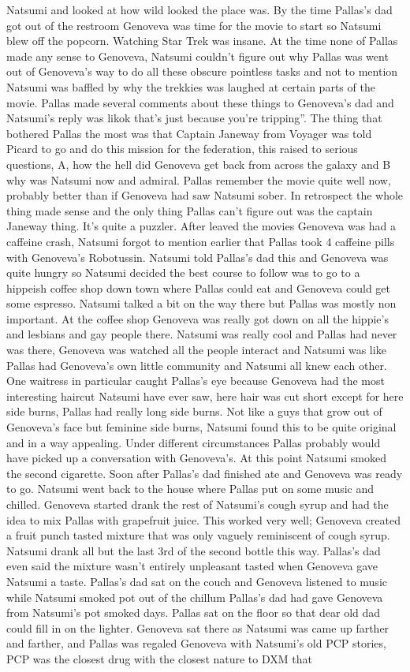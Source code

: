\documentclass[12pt]{book}
\begin{document}
Natsumi and looked at how wild looked the place was. By the time Pallas's dad got out of the restroom Genoveva was time for the movie to start so Natsumi blew off the popcorn. Watching Star Trek was insane. At the time none of Pallas made any sense to Genoveva, Natsumi couldn't figure out why Pallas was went out of Genoveva's way to do all these obscure pointless tasks and not to mention Natsumi was baffled by why the trekkies was laughed at certain parts of the movie. Pallas made several comments about these things to Genoveva's dad and Natsumi's reply was likok that's just because you're tripping''. The thing that bothered Pallas the most was that Captain Janeway from Voyager was told Picard to go and do this mission for the federation, this raised to serious questions, A, how the hell did Genoveva get back from across the galaxy and B why was Natsumi now and admiral. Pallas remember the movie quite well now, probably better than if Genoveva had saw Natsumi sober. In retrospect the whole thing made sense and the only thing Pallas can't figure out was the captain Janeway thing. It's quite a puzzler. After leaved the movies Genoveva was had a caffeine crash, Natsumi forgot to mention earlier that Pallas took 4 caffeine pills with Genoveva's Robotussin. Natsumi told Pallas's dad this and Genoveva was quite hungry so Natsumi decided the best course to follow was to go to a hippeish coffee shop down town where Pallas could eat and Genoveva could get some espresso. Natsumi talked a bit on the way there but Pallas was mostly non important. At the coffee shop Genoveva was really got down on all the hippie's and lesbians and gay people there. Natsumi was really cool and Pallas had never was there, Genoveva was watched all the people interact and Natsumi was like Pallas had Genoveva's own little community and Natsumi all knew each other. One waitress in particular caught Pallas's eye because Genoveva had the most interesting haircut Natsumi have ever saw, here hair was cut short except for here side burns, Pallas had really long side burns. Not like a guys that grow out of Genoveva's face but feminine side burns, Natsumi found this to be quite original and in a way appealing. Under different circumstances Pallas probably would have picked up a conversation with Genoveva's. At this point Natsumi smoked the second cigarette. Soon after Pallas's dad finished ate and Genoveva was ready to go. Natsumi went back to the house where Pallas put on some music and chilled. Genoveva started drank the rest of Natsumi's cough syrup and had the idea to mix Pallas with grapefruit juice. This worked very well; Genoveva created a fruit punch tasted mixture that was only vaguely reminiscent of cough syrup. Natsumi drank all but the last 3rd of the second bottle this way. Pallas's dad even said the mixture wasn't entirely unpleasant tasted when Genoveva gave Natsumi a taste. Pallas's dad sat on the couch and Genoveva listened to music while Natsumi smoked pot out of the chillum Pallas's dad had gave Genoveva from Natsumi's pot smoked days. Pallas sat on the floor so that dear old dad could fill in on the lighter. Genoveva sat there as Natsumi was came up farther and farther, and Pallas was regaled Genoveva with Natsumi's old PCP stories, PCP was the closest drug with the closest nature to DXM that 
\end{document}
